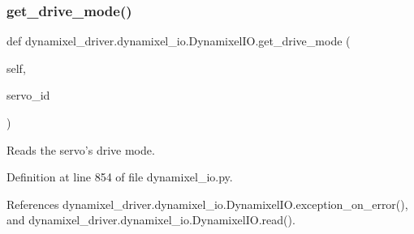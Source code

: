 \mbox{\label{classdynamixel__driver_1_1dynamixel__io_1_1_dynamixel_i_o_ad81c7f3da8654306f00f7ad9a2cbf54c}} 
\subsubsection{\texorpdfstring{get\+\_\+drive\+\_\+mode()}{get\_drive\_mode()}}
{\footnotesize\ttfamily def dynamixel\+\_\+driver.\+dynamixel\+\_\+io.\+Dynamixel\+I\+O.\+get\+\_\+drive\+\_\+mode (\begin{DoxyParamCaption}\item[{}]{self,  }\item[{}]{servo\+\_\+id }\end{DoxyParamCaption})}

\begin{DoxyVerb}Reads the servo's drive mode. \end{DoxyVerb}
 

Definition at line 854 of file dynamixel\+\_\+io.\+py.



References dynamixel\+\_\+driver.\+dynamixel\+\_\+io.\+Dynamixel\+I\+O.\+exception\+\_\+on\+\_\+error(), and dynamixel\+\_\+driver.\+dynamixel\+\_\+io.\+Dynamixel\+I\+O.\+read().


